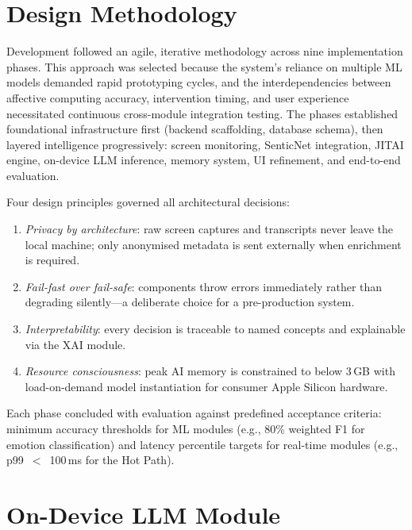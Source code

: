 \section{Design Methodology}
\label{sec:design_methodology}

Development followed an agile, iterative methodology across nine implementation phases. This approach was selected because the system's reliance on multiple ML models demanded rapid prototyping cycles, and the interdependencies between affective computing accuracy, intervention timing, and user experience necessitated continuous cross-module integration testing. The phases established foundational infrastructure first (backend scaffolding, database schema), then layered intelligence progressively: screen monitoring, SenticNet integration, JITAI engine, on-device LLM inference, memory system, UI refinement, and end-to-end evaluation.

Four design principles governed all architectural decisions:

\begin{enumerate}[leftmargin=*, itemsep=4pt]
  \item \emph{Privacy by architecture}: raw screen captures and transcripts never leave the local machine; only anonymised metadata is sent externally when enrichment is required.
  \item \emph{Fail-fast over fail-safe}: components throw errors immediately rather than degrading silently---a deliberate choice for a pre-production system.
  \item \emph{Interpretability}: every decision is traceable to named concepts and explainable via the XAI module.
  \item \emph{Resource consciousness}: peak AI memory is constrained to below 3\,GB with load-on-demand model instantiation for consumer Apple Silicon hardware.
\end{enumerate}

Each phase concluded with evaluation against predefined acceptance criteria: minimum accuracy thresholds for ML modules (e.g., 80\% weighted F1 for emotion classification) and latency percentile targets for real-time modules (e.g., p99~$<$~100\,ms for the Hot Path).


\section{On-Device LLM Module}
\label{sec:llm_module}

